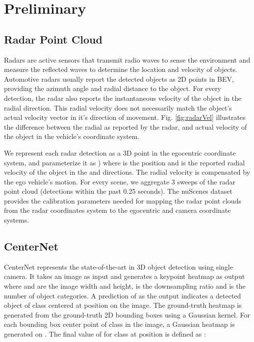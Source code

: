 \documentclass[10pt,twocolumn,letterpaper]{article}
\begin{document}
   
   \section{Preliminary}
   \subsection{Radar Point Cloud}
   Radars are active sensors that transmit radio waves to sense the environment 
   and measure the reflected waves to determine the location and velocity of 
   objects. Automotive radars usually report the detected objects as 2D points in 
   BEV, providing the azimuth angle and radial distance to the object. 
   For every detection, the radar also reports the instantaneous velocity of the 
   object in the radial direction. This radial velocity does not 
   necessarily match the object's actual velocity vector in it's direction of movement.
   Fig. \ref{fig:radarVel} illustrates the difference between the radial as reported
   by the radar, and actual velocity of the object in the vehicle's coordinate system.
   
   We represent each radar detection as a 3D point in the egocentric coordinate
   system, and parameterize it as ) where  is the
   position and  is the reported radial velocity of the object in the 
    and  directions. The radial velocity is compensated by the ego vehicle's 
   motion. For every scene, we aggregate 3 sweeps of the radar point cloud 
   (detections within the past 0.25 seconds). The nuScenes dataset provides the 
   calibration parameters needed for mapping the radar point clouds from the 
   radar coordinates system to the egocentric and camera coordinate systems.
   
   \subsection{CenterNet}
   CenterNet \cite{zhou2019objects} represents the state-of-the-art in 3D object detection using single camera. It takes an image  as input and 
   generates a keypoint heatmap 
   as output where  and  are the image width and height,  is the 
   downsampling ratio and  is the number of object categories. A prediction of 
    as the output indicates a detected object of class  
   centered at position  on the image. 
   The ground-truth heatmap  
   is generated from the ground-truth 2D bounding boxes using a Gaussian kernel. 
   For each bounding box center point  of class  in the 
   image, a Gaussian heatmap is generated on . The final value of 
    for class  at position  is defined as 
   \cite{zhou2019objects}:\useshortskip
   
\end{document}
